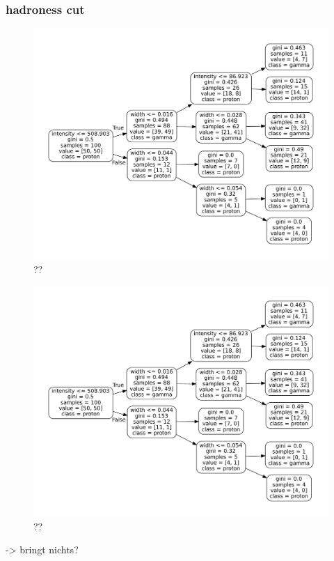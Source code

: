 \subsubsection{hadroness cut}

\begin{figure}
    \includegraphics[width=.8\textwidth]{Plots/decision_tree.pdf}
    \caption{??}
    \label{fig:??}
\end{figure}

\begin{figure}
    \includegraphics[width=.8\textwidth]{Plots/decision_tree.pdf}
    \caption{??}
    \label{fig:??}
\end{figure}

-> bringt nichts?